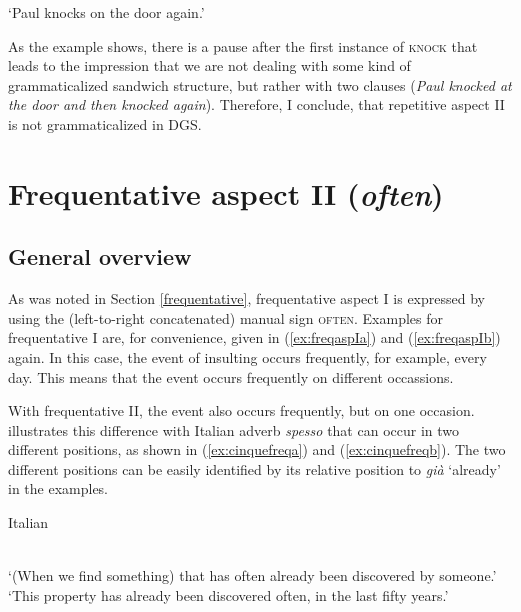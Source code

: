 \begin{exe}
\glt `Paul knocks on the door again.' \label{ggsrepetitivetwo}
\end{exe}

\noindent As the example shows, there is a pause after the first instance of \textsc{knock} that leads to the impression that we are not dealing with some kind of grammaticalized sandwich structure, but rather with two clauses (\textit{Paul knocked at the door and then knocked again}). Therefore, I conclude, that repetitive aspect II is not grammaticalized in DGS. 




\section{Frequentative aspect II (\textit{often})}\label{frequentatitivetwo}
\subsection{General overview}
As was noted in Section \ref{frequentative}, frequentative aspect I is expressed by using the (left-to-right concatenated) manual sign \textsc{often}. Examples for frequentative I are, for convenience, given in (\ref{ex:freqaspIa}) and (\ref{ex:freqaspIb}) again. In this case, the event of insulting occurs frequently, for example, every day. This means that the event occurs frequently on different occassions. 

\begin{exe}
\ex\begin{xlist} 
\end{xlist}
\end{exe} 

\noindent With frequentative II, the event also occurs frequently, but on one occasion. \citet[92]{cinque1999adverbs} illustrates this difference with Italian adverb \textit{spesso} that can occur in two different positions, as shown in (\ref{ex:cinquefreqa}) and (\ref{ex:cinquefreqb}). The two different positions can be easily identified by its relative position to \textit{già} `already' in the examples. 

\begin{exe}
\ex Italian \citep[92]{cinque1999adverbs}\begin{xlist} 
 \\
`(When we find something) that has often already been discovered by someone.' \label{ex:cinquefreqa}
 \\
`This property has already been discovered often, in the last fifty years.' \label{ex:cinquefreqb}
\end{xlist}
\end{exe} 


